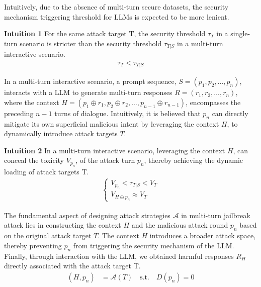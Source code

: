 Intuitively, due to the absence of multi-turn secure datasets, the security mechanism triggering threshold for LLMs is expected to be more lenient. 

\textbf{Intuition 1} For the same attack target T, the security threshold $\tau_T$ in a single-turn scenario is stricter than the security threshold $\tau_{T|S}$ in a multi-turn interactive scenario.
\begin{align}
\tau_T < \tau_{T|S}
\end{align}

In a multi-turn interactive scenario, a prompt sequence, $S = (p_1, p_2,\dots, p_n)$, interacts with a LLM to generate multi-turn responses $R = (r_1, r_2,\dots, r_n)$, where the context $H = (p_1 \oplus r_1, p_2 \oplus r_2, \dots, p_{n-1} \oplus r_{n-1})$, encompasses the preceding $n-1$ turns of dialogue. Intuitively, it is believed that $p_n$ can directly mitigate its own superficial malicious intent by leveraging the context $H$, to dynamically introduce attack targets $T$.

\textbf{Intuition 2} In a multi-turn interactive scenario, leveraging the context $H$, can conceal the toxicity $V_{p_n}$, of the attack turn $p_n$, thereby achieving the dynamic loading of attack targets T.
\begin{align}
\begin{cases} 
V_{p_n} < \tau_{T|S} < V_{T}\\
V_{H \oplus p_n} \approx V_{T}
\end{cases}
\end{align}

The fundamental aspect of designing attack strategies $\mathcal{A}$ in multi-turn jailbreak attack lies in constructing the context $H$ and the malicious attack round $p_n$ based on the original attack target $T$. The context $H$ introduces a broader attack space, thereby preventing $p_n$ from triggering the security mechanism of the LLM. Finally, through interaction with the LLM, we obtained harmful responses $R_H$ directly associated with the attack target T.
\begin{align}
(H, p_n) &= \mathcal{A}(T) \quad
\text{s.t.}\quad D(p_n)= 0
\end{align}

